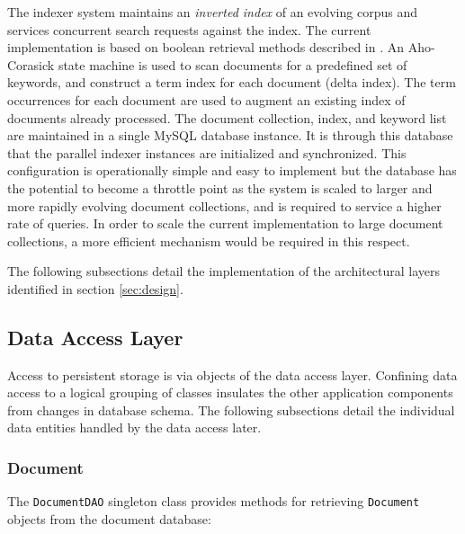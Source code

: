 \documentclass[10pt]{report}
\begin{document}
The indexer system maintains an \textit{inverted index} of an evolving
corpus and services concurrent search requests against the index. The
current implementation is based on boolean retrieval methods described
in \cite{RefWorks:109}. An Aho-Corasick state machine
\cite{RefWorks:103} is used to scan documents for a predefined set of
keywords, and construct a term index for each document (delta
index). The term occurrences for each document are used to augment an
existing index of documents already processed. The document
collection, index, and keyword list are maintained in a single MySQL
database instance. It is through this database that the parallel
indexer instances are initialized and synchronized. This configuration
is operationally simple and easy to implement but the database has the
potential to become a throttle point as the system is scaled to larger
and more rapidly evolving document collections, and is required to
service a higher rate of queries. In order to scale the current
implementation to large document collections, a more efficient
mechanism would be required in this respect.

The following subsections detail the implementation of the
architectural layers identified in section \ref{sec:design}.

\subsection{Data Access Layer}
\label{sec:dataaccesslayer}
Access to persistent storage is via objects of the data access
layer. Confining data access to a logical grouping of classes
insulates the other application components from changes in database
schema. The following subsections detail the individual data entities
handled by the data access later.


\subsubsection{Document}
\label{sec:document}
The \texttt{DocumentDAO} singleton class provides methods for retrieving
\texttt{Document} objects from the document database: 
\end{document}
